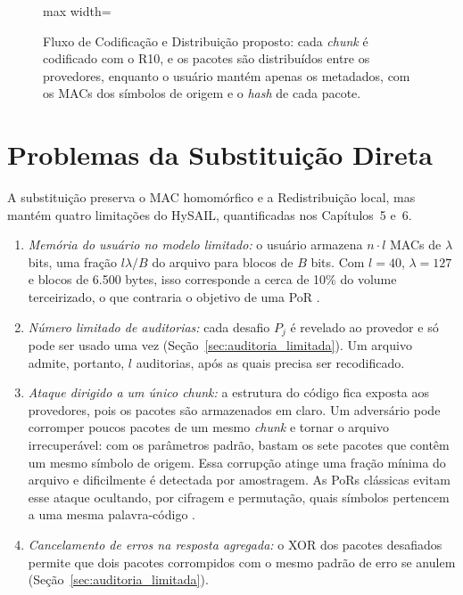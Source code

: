 \begin{figure}[htbp]
	\centering
	\begin{adjustbox}{max width=\textwidth}
		
	\end{adjustbox}
	\caption{Fluxo de Codificação e Distribuição proposto: cada \emph{chunk} é codificado com o R10, e os pacotes são distribuídos entre os provedores, enquanto o usuário mantém apenas os metadados, com os \acrshort{MAC}s dos símbolos de origem e o \emph{hash} de cada pacote.}
	\label{fig:hybolt_fluxo}
\end{figure}

\section{Problemas da Substituição Direta}
\label{sec:problemas_substituicao}

A substituição preserva o \acrshort{MAC} homomórfico e a Redistribuição local, mas mantém quatro limitações do HySAIL, quantificadas nos Capítulos~5 e~6.

\begin{enumerate}
	\item \textit{Memória do usuário no modelo limitado:} o usuário armazena $n \cdot l$ \acrshort{MAC}s de $\lambda$ bits, uma fração $l \lambda / B$ do arquivo para blocos de $B$ bits. Com $l = 40$, $\lambda = 127$ e blocos de 6.500 bytes, isso corresponde a cerca de 10\% do volume terceirizado, o que contraria o objetivo de uma \acrshort{PoR} \cite{juels2007pors}.
	\item \textit{Número limitado de auditorias:} cada desafio $P_j$ é revelado ao provedor e só pode ser usado uma vez (Seção~\ref{sec:auditoria_limitada}). Um arquivo admite, portanto, $l$ auditorias, após as quais precisa ser recodificado.
	\item \textit{Ataque dirigido a um único \emph{chunk}:} a estrutura do código fica exposta aos provedores, pois os pacotes são armazenados em claro. Um adversário pode corromper poucos pacotes de um mesmo \emph{chunk} e tornar o arquivo irrecuperável: com os parâmetros padrão, bastam os sete pacotes que contêm um mesmo símbolo de origem. Essa corrupção atinge uma fração mínima do arquivo e dificilmente é detectada por amostragem. As \acrshort{PoR}s clássicas evitam esse ataque ocultando, por cifragem e permutação, quais símbolos pertencem a uma mesma palavra-código \cite{juels2007pors,bowers2009proofs}.
	\item \textit{Cancelamento de erros na resposta agregada:} o XOR dos pacotes desafiados permite que dois pacotes corrompidos com o mesmo padrão de erro se anulem (Seção~\ref{sec:auditoria_limitada}).
\end{enumerate}

